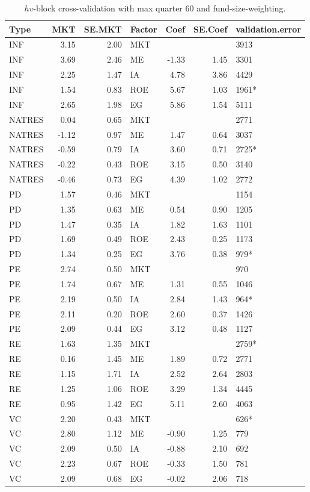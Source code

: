 \documentclass[12pt]{article}
\begin{document}
\begin{table}[ht]
	\centering
	\begin{tabular}{lrrlrrl}
		Type & MKT & SE.MKT & Factor & Coef & SE.Coef & validation.error \\ 
		\hline
		\hline
		INF & 3.15 & 2.00 & MKT &  &  & 3913 \\ 
		INF & 3.69 & 2.46 & ME & -1.33 & 1.45 & 3301 \\ 
		INF & 2.25 & 1.47 & IA & 4.78 & 3.86 & 4429 \\ 
		INF & 1.54 & 0.83 & ROE & 5.67 & 1.03 & 1961* \\ 
		INF & 2.65 & 1.98 & EG & 5.86 & 1.54 & 5111 \\ 
		\hline
		NATRES & 0.04 & 0.65 & MKT &  &  & 2771 \\ 
		NATRES & -1.12 & 0.97 & ME & 1.47 & 0.64 & 3037 \\ 
		NATRES & -0.59 & 0.79 & IA & 3.60 & 0.71 & 2725* \\ 
		NATRES & -0.22 & 0.43 & ROE & 3.15 & 0.50 & 3140 \\ 
		NATRES & -0.46 & 0.73 & EG & 4.39 & 1.02 & 2772 \\ 
		\hline
		PD & 1.57 & 0.46 & MKT &  &  & 1154 \\ 
		PD & 1.35 & 0.63 & ME & 0.54 & 0.90 & 1205 \\ 
		PD & 1.47 & 0.35 & IA & 1.82 & 1.63 & 1101 \\ 
		PD & 1.69 & 0.49 & ROE & 2.43 & 0.25 & 1173 \\ 
		PD & 1.34 & 0.25 & EG & 3.76 & 0.38 & 979* \\ 
		\hline
		PE & 2.74 & 0.50 & MKT &  &  & 970 \\ 
		PE & 1.74 & 0.67 & ME & 1.31 & 0.55 & 1046 \\ 
		PE & 2.19 & 0.50 & IA & 2.84 & 1.43 & 964* \\ 
		PE & 2.11 & 0.20 & ROE & 2.60 & 0.37 & 1426 \\ 
		PE & 2.09 & 0.44 & EG & 3.12 & 0.48 & 1127 \\ 
		\hline
		RE & 1.63 & 1.35 & MKT &  &  & 2759* \\ 
		RE & 0.16 & 1.45 & ME & 1.89 & 0.72 & 2771 \\ 
		RE & 1.15 & 1.71 & IA & 2.52 & 2.64 & 2803 \\ 
		RE & 1.25 & 1.06 & ROE & 3.29 & 1.34 & 4445 \\ 
		RE & 0.95 & 1.42 & EG & 5.11 & 2.60 & 4063 \\ 
		\hline
		VC & 2.20 & 0.43 & MKT &  &  & 626* \\ 
		VC & 2.80 & 1.12 & ME & -0.90 & 1.25 & 779 \\ 
		VC & 2.09 & 0.50 & IA & -0.88 & 2.10 & 692 \\ 
		VC & 2.23 & 0.67 & ROE & -0.33 & 1.50 & 781 \\ 
		VC & 2.09 & 0.68 & EG & -0.02 & 2.06 & 718 \\ 
		\hline
		\hline
	\end{tabular}
	\caption{$hv$-block cross-validation with max quarter 60 and fund-size-weighting.}
	\label{tab:cv_60_fw_dep}
\end{table}
\end{document}
